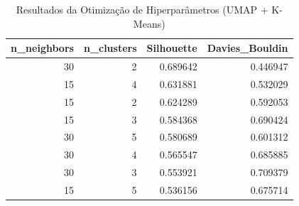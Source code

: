 \begin{table}
\caption{Resultados da Otimização de Hiperparâmetros (UMAP + K-Means)}
\label{tab:otimizacao_clustering}
\begin{tabular}{rrrr}
\toprule
n_neighbors & n_clusters & Silhouette & Davies_Bouldin \\
\midrule
30 & 2 & 0.689642 & 0.446947 \\
15 & 4 & 0.631881 & 0.532029 \\
15 & 2 & 0.624289 & 0.592053 \\
15 & 3 & 0.584368 & 0.690424 \\
30 & 5 & 0.580689 & 0.601312 \\
30 & 4 & 0.565547 & 0.685885 \\
30 & 3 & 0.553921 & 0.709379 \\
15 & 5 & 0.536156 & 0.675714 \\
\bottomrule
\end{tabular}
\end{table}
